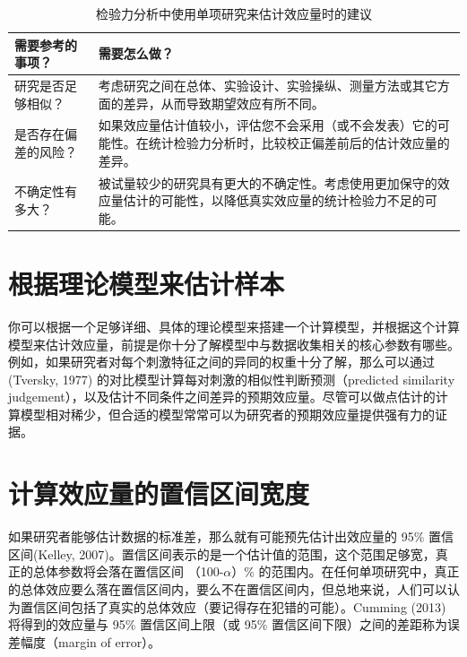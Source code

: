 \documentclass[
  letterpaper,
  DIV=11,
  numbers=noendperiod]{scrreprt}
\begin{document}
\hypertarget{tbl-table-es-just}{}
\begin{table}
\caption{\label{tbl-table-es-just}检验力分析中使用单项研究来估计效应量时的建议 }\tabularnewline

\centering
\begin{tabular}{>{\raggedright\arraybackslash}p{5cm}|>{\raggedright\arraybackslash}p{10cm}}
\hline
需要参考的事项？ & 需要怎么做？\\
\hline
研究是否足够相似？ & 考虑研究之间在总体、实验设计、实验操纵、测量方法或其它方面的差异，从而导致期望效应有所不同。\\
\hline
是否存在偏差的风险？ & 如果效应量估计值较小，评估您不会采用（或不会发表）它的可能性。在统计检验力分析时，比较校正偏差前后的估计效应量的差异。\\
\hline
不确定性有多大？ & 被试量较少的研究具有更大的不确定性。考虑使用更加保守的效应量估计的可能性，以降低真实效应量的统计检验力不足的可能。\\
\hline
\end{tabular}
\end{table}

\hypertarget{ux6839ux636eux7406ux8bbaux6a21ux578bux6765ux4f30ux8ba1ux6837ux672c}{%
\section{根据理论模型来估计样本}\label{ux6839ux636eux7406ux8bbaux6a21ux578bux6765ux4f30ux8ba1ux6837ux672c}}

你可以根据一个足够详细、具体的理论模型来搭建一个计算模型，并根据这个计算模型来估计效应量，前提是你十分了解模型中与数据收集相关的核心参数有哪些。例如，如果研究者对每个刺激特征之间的异同的权重十分了解，那么可以通过(Tversky,
1977) 的对比模型计算每对刺激的相似性判断预测（predicted similarity
judgement），以及估计不同条件之间差异的预期效应量。尽管可以做点估计的计算模型相对稀少，但合适的模型常常可以为研究者的预期效应量提供强有力的证据。

\hypertarget{ux8ba1ux7b97ux6548ux5e94ux91cfux7684ux7f6eux4fe1ux533aux95f4ux5bbdux5ea6}{%
\section{计算效应量的置信区间宽度}\label{ux8ba1ux7b97ux6548ux5e94ux91cfux7684ux7f6eux4fe1ux533aux95f4ux5bbdux5ea6}}

如果研究者能够估计数据的标准差，那么就有可能预先估计出效应量的 95\%
置信区间(Kelley,
2007)。置信区间表示的是一个估计值的范围，这个范围足够宽，真正的总体参数将会落在置信区间
（100-\(\alpha\)）\%
的范围内。在任何单项研究中，真正的总体效应要么落在置信区间内，要么不在置信区间内，但总地来说，人们可以认为置信区间包括了真实的总体效应（要记得存在犯错的可能）。Cumming
(2013) 将得到的效应量与 95\% 置信区间上限（或 95\%
置信区间下限）之间的差距称为误差幅度（margin of error）。
\end{document}
